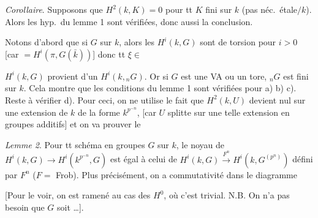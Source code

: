 \documentclass[11pt,a4paper]{article}
\begin{document}
\emph{Corollaire}. Supposons que $H^2(k,K)=0$ pour tt $K$ fini sur $k$ (pas
néc.\ étale$/k$). Alors les  hyp.\ du lemme 1 sont vérifiées,
donc aussi la conclusion.

Notons d'abord que si $G$  sur $k$, alors les $H^i(k,G)$
sont de torsion pour $i>0$ [car $= H^i(\pi, G(\bar k))$] donc
\struck{\ill{}} tt $\xi \in$


$H^i(k,G)$ provient d'un $H^i(k, {}_nG)$. Or si $G$ est une VA ou un tore,
${}_nG$ est fini sur $k$. Cela montre que les conditions du lemme 1 sont
vérifiées pour a) b) c). Reste à vérifier d). Pour ceci, on ne
 utilise \struck{\ill{}} le fait que $H^2(k,U)$ devient nul
sur une extension de $k$ de la forme $k^{p^{-n}}$, [car $U$ splitte sur une
telle extension en groupes additifs] et on va prouver le

\emph{Lemme 2}. Pour tt schéma en groupes $G$ sur $k$, le noyau de
$H^i(k,G) \to H^i(k^{p^{-n}},G)$ est égal à celui de
$H^i(k,G) \xrightarrow{F^n} H^i(k, G^{(p^n)})$ défini par $F^n$ ($F = $ Frob).
Plus précisément, on a commutativité dans le diagramme



[Pour le voir, on est ramené au cas des $H^0$, où c'est trivial. N.B.
On n'a pas besoin que $G$ soit  \ldots].


\end{document}
